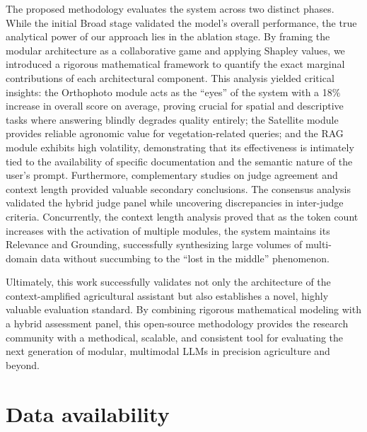 \documentclass[preprint,review,12pt,authoryear]{elsarticle}
\begin{document}
The proposed methodology evaluates the system across two distinct phases. While the initial Broad stage validated the model's overall performance, the true analytical power of our approach lies in the ablation stage. By framing the modular architecture as a collaborative game and applying Shapley values, we introduced a rigorous mathematical framework to quantify the exact marginal contributions of each architectural component. This analysis yielded critical insights: the Orthophoto module acts as the ``eyes'' of the system with a 18$\%$ increase in overall score on average, proving crucial for spatial and descriptive tasks where answering blindly degrades quality entirely; the Satellite module provides reliable agronomic value for vegetation-related queries; and the RAG module exhibits high volatility, demonstrating that its effectiveness is intimately tied to the availability of specific documentation and the semantic nature of the user's prompt. Furthermore, complementary studies on judge agreement and context length provided valuable secondary conclusions. The consensus analysis validated the hybrid judge panel while uncovering discrepancies in inter-judge criteria. Concurrently, the context length analysis proved that as the token count increases with the activation of multiple modules, the system maintains its Relevance and Grounding, successfully synthesizing large volumes of multi-domain data without succumbing to the ``lost in the middle'' phenomenon.

Ultimately, this work successfully validates not only the architecture of the context-amplified agricultural assistant but also establishes a novel, highly valuable evaluation standard. By combining rigorous mathematical modeling with a hybrid assessment panel, this open-source methodology provides the research community with a methodical, scalable, and consistent tool for evaluating the next generation of modular, multimodal LLMs in precision agriculture and beyond.


\section*{Data availability} \label{sec:Data_av}
\end{document}
